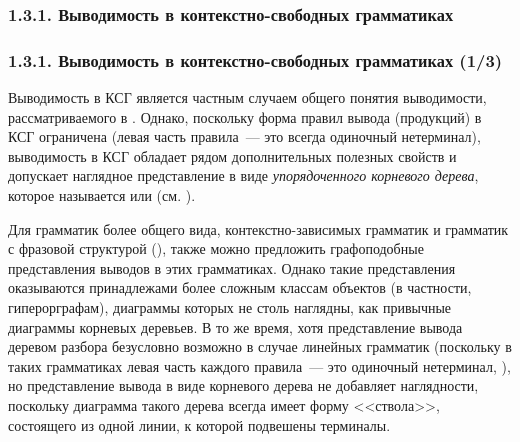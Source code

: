 \subsubsection{1.3.1. Выводимость в контекстно-свободных грамматиках}\label{1.3.1.}
\begin{frame}
\frametitle{1.3.1. Выводимость в контекстно-свободных грамматиках (1/3)}

Выводимость в КСГ является частным случаем общего
понятия выводимости, рассматриваемого в . Однако, поскольку форма правил вывода (продукций)
в КСГ ограничена (левая часть правила~--- это всегда одиночный
нетерминал), выводимость в КСГ обладает 
рядом дополнительных полезных свойств и допускает наглядное 
представление в виде {\em упорядоченного корневого дерева},
которое называется   или   
(см. ).


\begin{remark}
Для грамматик более общего вида, контекстно-зависимых
грамматик и грамматик с фразовой структурой (), 
также можно предложить графоподобные представления
выводов в этих грамматиках.
Однако такие представления оказываются
принадлежами более сложным классам объектов
(в частности, гиперорграфам), 
диаграммы которых не столь наглядны, как привычные
диаграммы корневых деревьев.
В то же время, хотя представление вывода деревом разбора
безусловно возможно в случае линейных грамматик
(поскольку в таких грамматиках левая 
часть каждого правила~---  
это одиночный нетерминал, ),
но представление вывода в виде корневого дерева
не добавляет наглядности, поскольку диаграмма 
такого дерева всегда имеет форму 
<<ствола>>, состоящего из одной линии, к которой
подвешены терминалы.  
\end{remark}

\end{frame}

